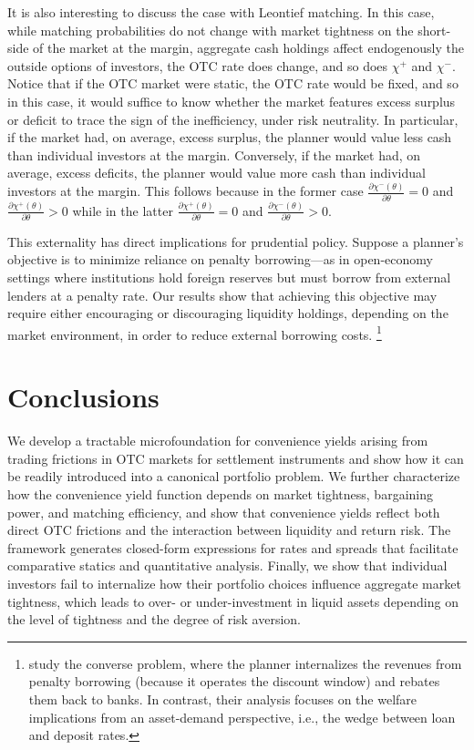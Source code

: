 \documentclass[12pt,american,english,notitlepage]{article}
\begin{document}
It is also interesting to discuss the case with Leontief matching. In this case, while matching probabilities do not change
with market tightness on the short-side of the market at the margin,
aggregate cash holdings affect endogenously the outside options of
investors, the OTC rate does change, and so does $\chi^{+}$ and $\chi^{-}.$
Notice that if the OTC market were static, the OTC rate would be fixed, and so in this case, it would suffice to know whether the market features excess surplus or deficit to trace the sign of the inefficiency,  under risk neutrality. In particular, if the market had, on average,
excess surplus, the planner would value less cash than individual investors at the margin. Conversely, if the market had, on average, excess deficits, the planner would value more cash than individual
investors at the margin. This follows because in the former case $\frac{\partial\chi^{-}(\theta)}{\partial\theta}=0$
and $\frac{\partial\chi^{+}(\theta)}{\partial\theta}>0$ while in
the latter $\frac{\partial\chi^{+}(\theta)}{\partial\theta}=0$ and
$\frac{\partial\chi^{-}(\theta)}{\partial\theta}>0.$

This externality has direct implications for prudential policy. Suppose a planner’s objective is to minimize reliance on penalty borrowing—as in open-economy settings where institutions hold foreign reserves but must borrow from external lenders at a penalty rate. Our results show that achieving this objective may require either encouraging or discouraging liquidity holdings, depending on the market environment, in order to reduce external borrowing costs. \footnote{\citet{ismailWelfareCostConvenience2025} study the converse problem, where the planner internalizes the revenues from penalty borrowing (because it operates the discount window) and rebates them back to banks. In contrast, their analysis focuses on the welfare implications from an asset-demand perspective, i.e., the wedge between loan and deposit rates.}

 \section{Conclusions}

 \label{sec:conclusions}
We develop a tractable microfoundation for convenience yields arising from trading frictions in OTC markets for settlement instruments and show how it can be readily introduced into a canonical portfolio problem. We further characterize how the convenience yield function depends on market tightness, bargaining power, and matching efficiency, and show that convenience yields reflect both direct OTC frictions and the interaction between liquidity and return risk. The framework generates closed-form expressions for rates and spreads that facilitate comparative statics and quantitative analysis.  Finally, we show that individual investors fail to internalize how their portfolio choices influence aggregate market tightness, which leads to over- or under-investment in liquid assets depending on the level of tightness and the degree of risk aversion.
\end{document}
